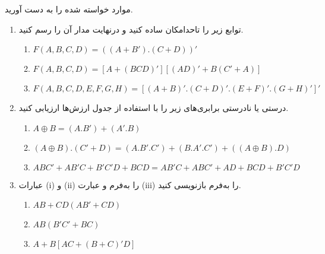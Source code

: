 موارد خواسته شده را به دست آورید.

\begin{enumerate}
	\item 
	توابع زیر را تاحدامکان ساده کنید و درنهایت مدار آن را رسم کنید.
	
	\begin{latin}
		\begin{enumerate}
			\item $F(A, B, C, D) = ((A + B').(C + D))'$
			
			\item $F(A,B,C,D) = [A + (BCD)' ][ (AD)' + B(C' + A) ]$
			
			\item $F(A,B,C,D,E,F,G,H) = [ (A + B)' . (C + D)' . (E + F)' . (G + H)' ]'$
		\end{enumerate}
	\end{latin}
	
	
	\item	
	درستی یا نادرستی برابری‌های زیر را با استفاده از جدول ارزش‌ها ارزیابی کنید.
	\begin{latin}
		\begin{enumerate}
			
			\item $A \oplus B = (A.B') + (A'.B)$
			
			\item $(A \oplus B) . (C' + D) = (A . B' . C') + (B . A' . C') + ((A \oplus B) . D)$
			
			\item $ABC′ + AB'C + B'C'D + BCD = AB'C + ABC' + AD + BCD + B'C'D$
		\end{enumerate}
	\end{latin}
	
	
	\item 
	عبارات (i) و (ii) را به‌فرم  و عبارت (iii) را به‌فرم  بازنویسی کنید.
	\begin{latin}
		\begin{enumerate}
			\item $AB + CD (AB' + CD)$
			
			\item $AB (B' C' + BC)$
			
			\item $A + B[AC + (B + C)' D]$
		\end{enumerate}
	\end{latin}
	
	
	
	
\end{enumerate}